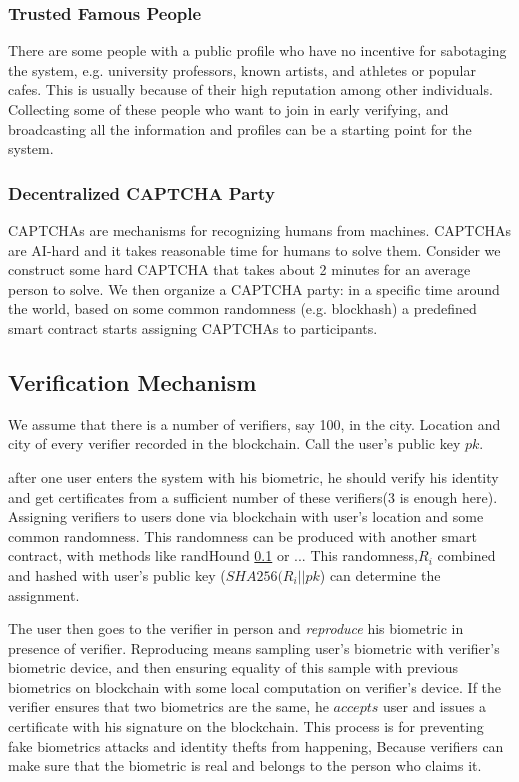 \documentclass[conference]{IEEEtran}
\begin{document}
\subsubsection*{Trusted Famous People}
There are some people with a public profile who have no incentive for sabotaging the system, e.g. university professors, known artists, and athletes or popular cafes. This is usually because of their high reputation among other individuals. Collecting some of these people who want to join in early verifying, and broadcasting all the information and profiles can be a starting point for the system.

\subsubsection*{Decentralized CAPTCHA Party}
CAPTCHAs \cite{CAPTCHA} are mechanisms for recognizing humans from machines. CAPTCHAs are AI-hard and it takes reasonable time for humans to solve them. Consider we construct some hard CAPTCHA that takes about 2 minutes for an average person to solve. We then organize a CAPTCHA party: in a specific time around the world, based on some common randomness (e.g. blockhash) a predefined smart contract starts assigning CAPTCHAs to participants. 

\subsection{Verification Mechanism}
We assume that there is a number of verifiers, say 100, in the city. Location and city of every verifier recorded in the blockchain. Call the user's public key $pk$.


 after one user enters the system with his biometric, he should verify his identity and get certificates from a sufficient number of these verifiers(3 is enough here). Assigning verifiers to users done via blockchain with user's location and some common randomness. This randomness can be produced with another smart contract, with methods like randHound \ref{} or ...   This randomness,$ R_i$ combined and hashed with user's public key ($SHA256(R_i || pk$) can determine the assignment. 
 
 
The user then goes to the verifier in person and \textit{reproduce}  his biometric in presence of verifier. Reproducing means sampling user's biometric with verifier's biometric device, and then ensuring equality of this sample with previous biometrics on blockchain with some local computation on verifier's device. If the verifier ensures that two biometrics are the same, he $accepts$ user and issues a certificate with his signature on the blockchain. This process is for  preventing fake biometrics attacks and identity thefts from happening, Because verifiers can make sure that the biometric is real and belongs to the person who claims it. 
\end{document}
